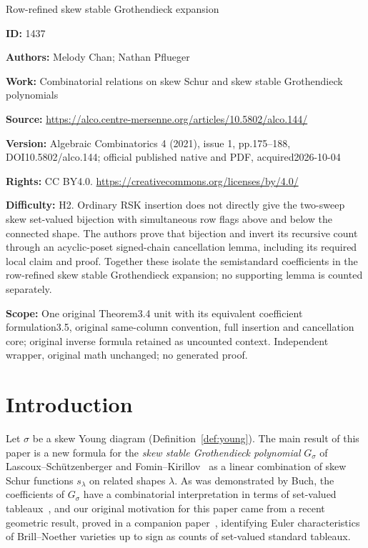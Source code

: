 \documentclass[11pt]{article}
\theoremstyle{definition}
\begin{document}
\begin{center}\Large Row-refined skew stable Grothendieck expansion\end{center}
\noindent\textbf{ID:} 1437\par
\noindent\textbf{Authors:} Melody Chan; Nathan Pflueger\par
\noindent\textbf{Work:} Combinatorial relations on skew Schur and skew stable Grothendieck polynomials\par
\noindent\textbf{Source:} \url{https://alco.centre-mersenne.org/articles/10.5802/alco.144/}\par
\noindent\textbf{Version:} Algebraic Combinatorics 4 (2021), issue 1, pp.175--188, DOI10.5802/alco.144; official published native and PDF, acquired2026-10-04\par
\noindent\textbf{Rights:} CC BY4.0. \url{https://creativecommons.org/licenses/by/4.0/}\par
\noindent\textbf{Difficulty:} H2. Ordinary RSK insertion does not directly give the two-sweep skew set-valued bijection with simultaneous row flags above and below the connected shape. The authors prove that bijection and invert its recursive count through an acyclic-poset signed-chain cancellation lemma, including its required local claim and proof. Together these isolate the semistandard coefficients in the row-refined skew stable Grothendieck expansion; no supporting lemma is counted separately.\par
\noindent\textbf{Scope:} One original Theorem3.4 unit with its equivalent coefficient formulation3.5, original same-column convention, full insertion and cancellation core; original inverse formula retained as uncounted context. Independent wrapper, original math unchanged; no generated proof.\par
\section{Introduction}

\noindent 
Let $\sigma$ be a skew Young diagram (Definition~\ref{def:young}).
The main result of this paper is a new formula for the \emph{skew stable Grothendieck polynomial} $G_\sigma$ of Lascoux--Sch{\"u}tzenberger and Fomin--Kirillov~\cite{fomin-kirillov-grothendieck,lascoux-schutzenberger} as a linear combination of skew Schur functions $s_\lambda$ on related shapes $\lambda$. As was demonstrated by Buch, the coefficients of $G_\sigma$ have a combinatorial interpretation in terms of set-valued tableaux~\cite{buch-littlewood-richardson}, and
our original motivation for this paper came from a recent geometric result, proved in a companion paper~\cite{chan-pflueger-euler}, identifying Euler characteristics of Brill--Noether varieties up to sign as counts of set-valued standard tableaux. 
\end{document}
